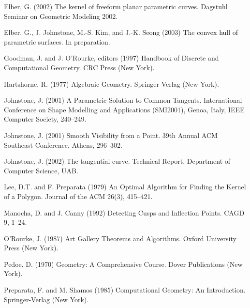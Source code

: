 \documentclass{sig-alternate}
\begin{document}

\begin{thebibliography}{99}


Elber, G. (2002)
The kernel of freeform planar parametric curves.
Dagstuhl Seminar on Geometric Modeling 2002.

Elber, G., J. Johnstone, M.-S. Kim, and J.-K. Seong (2003)
The convex hull of parametric surfaces.
In preparation.

Goodman, J. and J. O'Rourke, editors (1997)
Handbook of Discrete and Computational Geometry.
CRC Press (New York).

Hartshorne, R. (1977)
Algebraic Geometry.
Springer-Verlag (New York).

Johnstone, J. (2001)
A Parametric Solution to Common Tangents.
International Conference on Shape Modelling and Applications (SMI2001),
Genoa, Italy, IEEE Computer Society, 240--249.

Johnstone, J. (2001)
Smooth Visibility from a Point.
39th Annual ACM Southeast Conference, Athens, 296--302.

Johnstone, J. (2002)
The tangential curve.
Technical Report, Department of Computer Science, UAB.

Lee, D.T. and F. Preparata (1979)
An Optimal Algorithm for Finding the Kernel of a Polygon.
Journal of the ACM 26(3), 415--421.


Manocha, D. and J. Canny (1992)
Detecting Cusps and Inflection Points.
CAGD 9, 1--24.

O'Rourke, J. (1987)
Art Gallery Theorems and Algorithms.
Oxford University Press (New York).

Pedoe, D. (1970)
Geometry: A Comprehensive Course.
Dover Publications (New York).

Preparata, F. and M. Shamos (1985)
Computational Geometry: An Introduction.
Springer-Verlag (New York).


\end{thebibliography}

\ifACM
\balancecolumns
\fi
\end{document}

